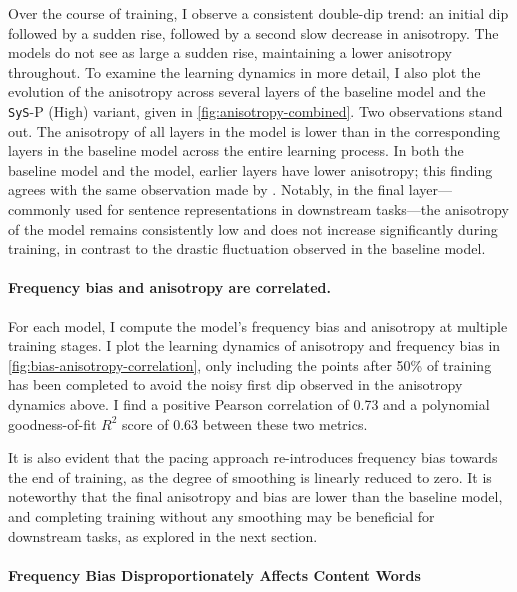 Over the course of training, I observe a consistent double-dip trend: an initial dip followed by a sudden rise, followed by a second slow decrease in anisotropy. The \smoothing models do not see as large a sudden rise, maintaining a lower anisotropy throughout. To examine the learning dynamics in more detail, I also plot the evolution of the anisotropy across several layers of the baseline model and the \texttt{SyS}-P (High) variant, given in \cref{fig:anisotropy-combined}. Two observations stand out. The anisotropy of all layers in the \smoothing model is lower than in the corresponding layers in the baseline model across the entire learning process. In both the baseline model and the \smoothing model, earlier layers have lower anisotropy; this finding agrees with the same observation made by \citeauthor{ethayarajh2019contextual}. Notably, in the final layer—commonly used for sentence representations in downstream tasks—the anisotropy of the \smoothing model remains consistently low and does not increase significantly during training, in contrast to the drastic fluctuation observed in the baseline model. 

\paragraph{Frequency bias and anisotropy are correlated.}

For each model, I compute the model's frequency bias and anisotropy at multiple training stages. I plot the learning dynamics of anisotropy and frequency bias in \cref{fig:bias-anisotropy-correlation}, only including the points after 50\% of training has been completed to avoid the noisy first dip observed in the anisotropy dynamics above. I find a positive Pearson correlation of 0.73 and a polynomial goodness-of-fit $R^2$ score of 0.63 between these two metrics.

It is also evident that the pacing approach re-introduces frequency bias towards the end of training, as the degree of smoothing is linearly reduced to zero. It is noteworthy that the final anisotropy and bias are lower than the baseline model, and completing training without any smoothing may be beneficial for downstream tasks, as explored in the next section.

\paragraph{Frequency Bias Disproportionately Affects Content Words}
\label{section:word-class-versus-word-frequency}


